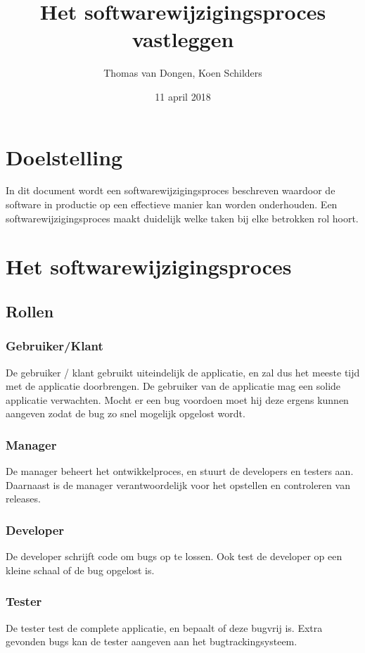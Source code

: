 \documentclass[12pt]{article}
\title{Het softwarewijzigingsproces vastleggen}
\author{Thomas van Dongen, Koen Schilders}
\date{11 april 2018}
\begin{document}
\begin{titlepage}
\maketitle
\end{titlepage}


\section{Doelstelling}
In dit document wordt een softwarewijzigingsproces beschreven waardoor de software in productie op een effectieve manier kan worden onderhouden. Een softwarewijzigingsproces maakt duidelijk welke taken bij elke betrokken rol hoort.


\section{Het softwarewijzigingsproces}
\subsection{Rollen}
\subsubsection{Gebruiker/Klant}
De gebruiker / klant gebruikt uiteindelijk de applicatie, en zal dus het meeste tijd met de applicatie doorbrengen. De gebruiker van de applicatie mag een solide applicatie verwachten. Mocht er een bug voordoen moet hij deze ergens kunnen aangeven zodat de bug zo snel mogelijk opgelost wordt.

\subsubsection{Manager}
De manager beheert het ontwikkelproces, en stuurt de developers en testers aan. Daarnaast is de manager verantwoordelijk voor het opstellen en controleren van releases.

\subsubsection{Developer}
De developer schrijft code om bugs op te lossen. Ook test de developer op een kleine schaal of de bug opgelost is.

\subsubsection{Tester}
De tester test de complete applicatie, en bepaalt of deze bugvrij is. Extra gevonden bugs kan de tester aangeven aan het bugtrackingsysteem.
\end{document}
